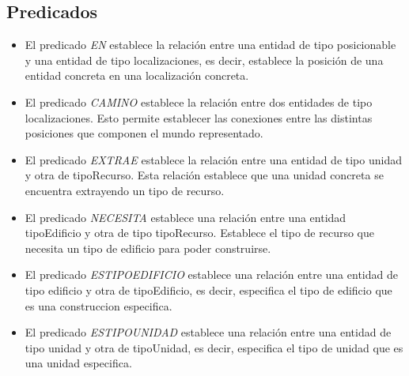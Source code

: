 \subsection{Predicados}
\begin{itemize}
   \item El predicado \textit{EN} establece la relación entre una entidad de tipo posicionable y una entidad de tipo localizaciones, es decir, establece la posición de una entidad concreta en una localización concreta.
   \item El predicado \textit{CAMINO} establece la relación entre dos entidades de tipo localizaciones. Esto permite establecer las conexiones entre las distintas posiciones que componen el mundo representado.
   \item El predicado \textit{EXTRAE} establece la relación entre una entidad de tipo unidad y otra de tipoRecurso. Esta relación establece que una unidad concreta se encuentra extrayendo un tipo de recurso.
   \item El predicado \textit{NECESITA} establece una relación entre una entidad tipoEdificio y otra de tipo tipoRecurso. Establece el tipo de recurso que necesita un tipo de edificio para poder construirse.
   \item El predicado \textit{ESTIPOEDIFICIO} establece una relación entre una entidad de tipo edificio y otra de tipoEdificio, es decir, especifica el tipo de edificio que es una construccion especifica.
   \item El predicado \textit{ESTIPOUNIDAD} establece una relación entre una entidad de tipo unidad y otra de tipoUnidad, es decir, especifica el tipo de unidad que es una unidad especifica.
\end{itemize}

